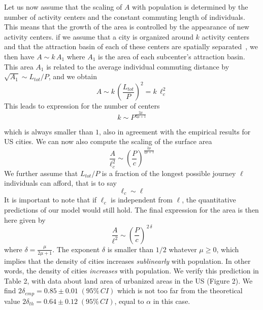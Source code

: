 Let us now assume that the scaling of $A$ with population is determined by the number of activity centers and the constant commuting length of individuals. This means that the growth of the area is controlled by the appearance of new activity centers. if we assume that a city is organized around $k$ activity centers and that the attraction basin of each of these centers are spatially separated~\cite{Louf:2013}, we then have  $A \sim k\, A_1$ where $A_1$ is the area of each subcenter's attraction basin. This area $A_1$ is related to the average individual commuting distance by $\sqrt{A_1} \sim L_{tot} / P$, and we obtain
%
\begin{equation}
A \sim k\,  \left( \frac{L_{tot}}{P} \right)^2 = k\, \ell_c^2
\label{eq:area_poly}
\end{equation}
%
This leads to expression for the number of centers
\begin{equation}
k \sim P^{\frac{2 \mu}{2\mu+1}}
\end{equation}

which is always smaller than $1$, also in agreement with the empirical results for US cities. We can now also compute the scaling of the surface area
\begin{equation}
\frac{A}{\ell_c^2} \sim \left( \frac{P}{c} \right)^{\frac{2 \mu}{2\mu+1}}
\end{equation}
We further assume that $L_{tot} / P$ is a fraction of the longest possible journey $\ell$ individuals can afford, that is to say 
\begin{equation}
\ell_c \sim \ell
\end{equation}
It is important to note that if $\ell_c$ is independent from $\ell$, the quantitative predictions of our model would still hold. 
%
The final expression for the area is then here given by
\begin{equation}
\frac{A}{\ell^2} \sim \left( \frac{P}{c} \right)^{\,2\,\delta}
\label{eq:area}
\end{equation}
%
where $\delta=\frac{\mu}{2\mu+1}$. The exponent $\delta$ is smaller than $1/2$ whatever $\mu\geq 0$, which implies that the density of cities increases \emph{sublinearly} with population. In other words, the density of cities \emph{increases}  with population. We verify this prediction in Table 2, with data about land area of urbanized areas in the US (Figure 2). We find $2 \delta_{emp} = 0.85 \pm 0.01\; (95\%\, CI)$ which is not too far from the theoretical value $2\delta_{th} = 0.64 \pm 0.12\; (95\%\, CI)$, equal to $\alpha$ in this case.

